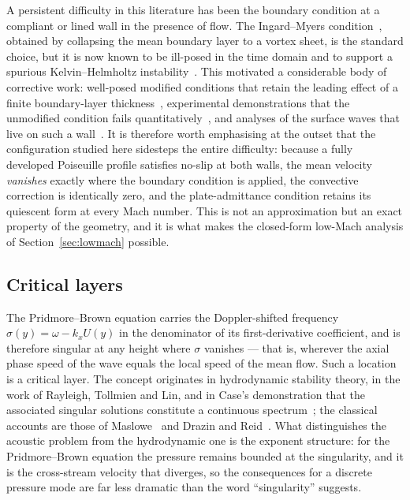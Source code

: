 \documentclass[11pt,a4paper]{article}
\theoremstyle{plain}
\theoremstyle{remark}
\begin{document}
A persistent difficulty in this literature has been the boundary condition at a compliant or lined
wall in the presence of flow. The Ingard--Myers condition~\cite{ingard,myers}, obtained by collapsing
the mean boundary layer to a vortex sheet, is the standard choice, but it is now known to be ill-posed
in the time domain and to support a spurious Kelvin--Helmholtz instability~\cite{brambley2009}. This
motivated a considerable body of corrective work: well-posed modified conditions that retain the
leading effect of a finite boundary-layer thickness~\cite{brambley,khamisbrambley}, experimental
demonstrations that the unmodified condition fails quantitatively~\cite{renouauregan}, and analyses of
the surface waves that live on such a wall~\cite{rienstra2003}. It is therefore worth emphasising at the
outset that the configuration studied here sidesteps the entire difficulty: because a fully developed
Poiseuille profile satisfies no-slip at both walls, the mean velocity \emph{vanishes} exactly where the
boundary condition is applied, the convective correction is identically zero, and the plate-admittance
condition retains its quiescent form at every Mach number. This is not an approximation but an exact
property of the geometry, and it is what makes the closed-form low-Mach analysis of
Section~\ref{sec:lowmach} possible.

\subsection{Critical layers}
The Pridmore--Brown equation carries the Doppler-shifted frequency $\sigma(y)=\omega-k_xU(y)$ in the
denominator of its first-derivative coefficient, and is therefore singular at any height where
$\sigma$ vanishes --- that is, wherever the axial phase speed of the wave equals the local speed of the
mean flow. Such a location is a critical layer. The concept originates in hydrodynamic stability
theory, in the work of Rayleigh, Tollmien and Lin, and in Case's demonstration that the associated
singular solutions constitute a continuous spectrum~\cite{case}; the classical accounts are those of
Maslowe~\cite{maslowe} and Drazin and Reid~\cite{drazinreid}. What distinguishes the acoustic problem
from the hydrodynamic one is the exponent structure: for the Pridmore--Brown equation the pressure
remains bounded at the singularity, and it is the cross-stream velocity that diverges, so the
consequences for a discrete pressure mode are far less dramatic than the word ``singularity'' suggests.
\end{document}
